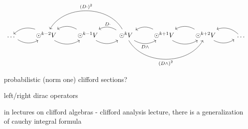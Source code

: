 \[
\begin{tikzcd}
\dots \arrow[r, bend right] & {\Large\odot}^{k-2}V \arrow[r, bend right] \arrow[l, bend right] & {\Large\odot}^{k-1}V \arrow[r, bend right] \arrow[l, bend right] & {\Large{\odot}}^k V \arrow[r, "D\wedge"', bend right] \arrow[l, "D\cdot"', bend right] \arrow[rr, "(D\wedge)^2"', bend right=60] \arrow[ll, "(D\cdot)^2"', bend right=60] & {\Large\odot}^{k+1}V \arrow[r, bend right] \arrow[l, bend right] & {\Large\odot}^{k+2}V \arrow[r, bend right] \arrow[l, bend right] & \dots \arrow[l, bend right]
\end{tikzcd}
\]

probabilistic (norm one) clifford sections? 

left/right dirac operators

in lectures on clifford algebras - clifford analysis lecture, there is a generalization of cauchy integral formula